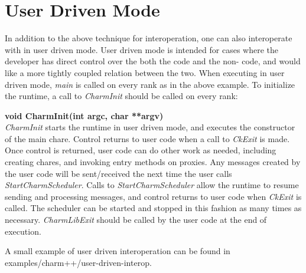 \section{User Driven Mode}
In addition to the above technique for interoperation, one can also interoperate
with \charmpp{} in user driven mode. User driven mode is intended for cases
where the developer has direct control over the both the \charmpp{} code and
the non-\charmpp{} code, and would like a more tightly coupled relation between
the two. When executing in user driven mode, {\em main} is called on every rank
as in the above example. To initialize the \charmpp{} runtime, a call to
{\em CharmInit} should be called on every rank:

{\bf void CharmInit(int argc, char **argv)} \\

{\em CharmInit} starts the \charmpp{} runtime in user driven mode, and executes
the constructor of the main chare. Control returns to user code when a call to
{\em CkExit} is made. Once control is returned, user code can do other work as
needed, including creating chares, and invoking entry methods on proxies. Any
messages created by the user code will be sent/received the next time the user
calls {\em StartCharmScheduler}. Calls to {\em StartCharmScheduler} allow the
\charmpp{} runtime to resume sending and processing messages, and control
returns to user code when {\em CkExit} is called. The \charmpp{} scheduler can
be started and stopped in this fashion as many times as necessary.
{\em CharmLibExit} should be called by the user code at the end of execution.

A small example of user driven interoperation can be found in
examples/charm++/user-driven-interop.
